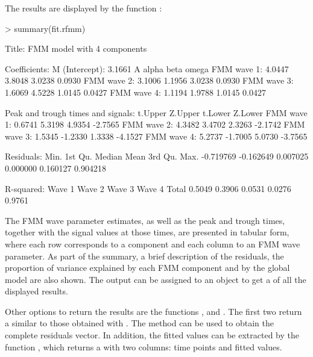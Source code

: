 The results are displayed by the function :
%
\begin{example}
> summary(fit.rfmm)

Title:
FMM model with 4 components

Coefficients:
M (Intercept): 3.1661
                  A  alpha   beta  omega
FMM wave 1:  4.0447 3.8048 3.0238 0.0930
FMM wave 2:  3.1006 1.1956 3.0238 0.0930
FMM wave 3:  1.6069 4.5228 1.0145 0.0427
FMM wave 4:  1.1194 1.9788 1.0145 0.0427

Peak and trough times and signals:
             t.Upper Z.Upper t.Lower Z.Lower
FMM wave 1:   0.6741  5.3198  4.9354 -2.7565
FMM wave 2:   4.3482  3.4702  2.3263 -2.1742
FMM wave 3:   1.5345 -1.2330  1.3338 -4.1527
FMM wave 4:   5.2737 -1.7005  5.0730 -3.7565

Residuals:
     Min.   1st Qu.    Median      Mean   3rd Qu.      Max. 
-0.719769 -0.162649  0.007025  0.000000  0.160127  0.904218 

R-squared:
Wave 1 Wave 2 Wave 3 Wave 4  Total 
0.5049 0.3906 0.0531 0.0276 0.9761 
\end{example}
%
The FMM wave parameter estimates, as well as the peak and trough times, together with the signal values at those times, are presented in tabular form, where each row corresponds to a component and each column to an FMM wave parameter. As part of the summary, a brief description of the residuals, the proportion of variance explained by each FMM component and by the global model are also shown.   
The  output can be assigned to an object to get a  of all the displayed results.

Other options to return the results are the functions ,  and . The first two return a  similar to those obtained with . The  method can be used to obtain the complete residuals vector. In addition, the fitted values can be extracted by the function , which returns a  with two columns: time points and fitted values.

